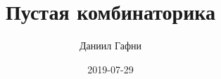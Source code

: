 \documentclass{article}%
\title{Пустая комбинаторика}%
\author{Даниил Гафни}%
\date{2019{-}07{-}29}%
\begin{document}
%
\normalsize%
\maketitle%
\end{document}
